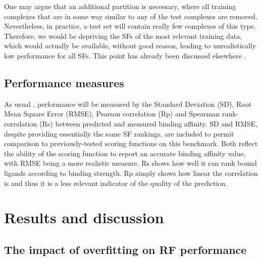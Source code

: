 One may argue that an additional partition is necessary, where all training complexes that are in some way similar to any of the test complexes are removed. Nevertheless, in practice, a test set will contain really few complexes of this type. Therefore, we would be depriving the SFs of the most relevant training data, which would actually be available, without good reason, leading to unrealistically low performance for all SFs. This point has already been discussed elsewhere \citep{908}.

\subsection{Performance measures}

As usual \citep{1313}, performance will be measured by the Standard Deviation (SD), Root Mean Square Error (RMSE), Pearson correlation (Rp) and Spearman rank-correlation (Rs) between predicted and measured binding affinity. SD and RMSE, despite providing essentially the same SF rankings, are included to permit comparison to previously-tested scoring functions on this benchmark. Both reflect the ability of the scoring function to report an accurate binding affinity value, with RMSE being a more realistic measure. Rs shows how well it can rank bound ligands according to binding strength. Rp simply shows how linear the correlation is and thus it is a less relevant indicator of the quality of the prediction.

\section{Results and discussion}

\subsection{The impact of overfitting on RF performance}

